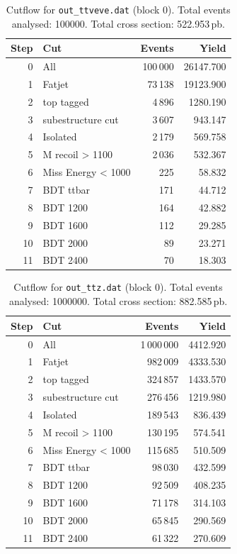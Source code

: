 \documentclass{article}
\begin{document}
\begin{table}[H]
\centering
\begin{tabular}{r l r r}
\toprule
Step & Cut & Events & Yield \\
\midrule
0 & All & 100\,000 & 26147.700 \\
1 & Fatjet & 73\,138 & 19123.900 \\
2 & top tagged & 4\,896 & 1280.190 \\
3 & subestructure cut & 3\,607 & 943.147 \\
4 & Isolated & 2\,179 & 569.758 \\
5 & M recoil > 1100 & 2\,036 & 532.367 \\
6 & Miss Energy < 1000 & 225 & 58.832 \\
7 & BDT ttbar & 171 & 44.712 \\
8 & BDT 1200 & 164 & 42.882 \\
9 & BDT 1600 & 112 & 29.285 \\
10 & BDT 2000 & 89 & 23.271 \\
11 & BDT 2400 & 70 & 18.303 \\
\bottomrule
\end{tabular}
\caption{Cutflow for \texttt{out\_ttveve.dat} (block 0). Total events analysed: 100000. Total cross section: 522.953\,pb.}
\label{tab:cutflow-out-ttveve-dat}
\end{table}

\begin{table}[H]
\centering
\begin{tabular}{r l r r}
\toprule
Step & Cut & Events & Yield \\
\midrule
0 & All & 1\,000\,000 & 4412.920 \\
1 & Fatjet & 982\,009 & 4333.530 \\
2 & top tagged & 324\,857 & 1433.570 \\
3 & subestructure cut & 276\,456 & 1219.980 \\
4 & Isolated & 189\,543 & 836.439 \\
5 & M recoil > 1100 & 130\,195 & 574.541 \\
6 & Miss Energy < 1000 & 115\,685 & 510.509 \\
7 & BDT ttbar & 98\,030 & 432.599 \\
8 & BDT 1200 & 92\,509 & 408.235 \\
9 & BDT 1600 & 71\,178 & 314.103 \\
10 & BDT 2000 & 65\,845 & 290.569 \\
11 & BDT 2400 & 61\,322 & 270.609 \\
\bottomrule
\end{tabular}
\caption{Cutflow for \texttt{out\_ttz.dat} (block 0). Total events analysed: 1000000. Total cross section: 882.585\,pb.}
\label{tab:cutflow-out-ttz-dat}
\end{table}
\end{document}
